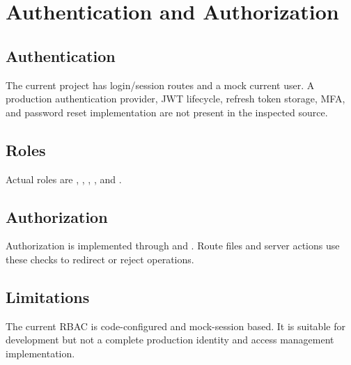 \chapter{Authentication and Authorization}
\section{Authentication}
The current project has login/session routes and a mock current user. A production authentication provider, JWT lifecycle, refresh token storage, MFA, and password reset implementation are not present in the inspected source.

\section{Roles}
Actual roles are , , , , and .

\section{Authorization}
Authorization is implemented through  and . Route files and server actions use these checks to redirect or reject operations.

\section{Limitations}
\begin{warningbox}
The current RBAC is code-configured and mock-session based. It is suitable for development but not a complete production identity and access management implementation.
\end{warningbox}
